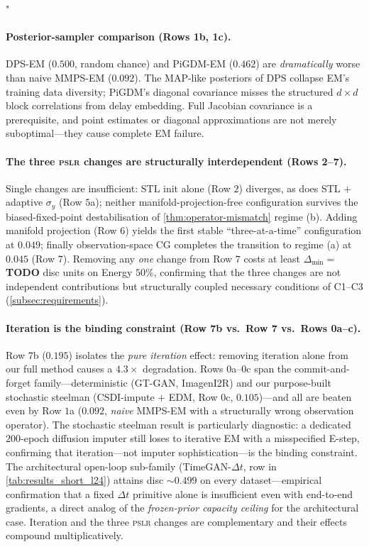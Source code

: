 "\documentclass{article}
\theoremstyle{plain}
\theoremstyle{definition}
\theoremstyle{remark}
\newcommand{\pslr}{\textsc{pslr}}
\begin{document}
\paragraph{Posterior-sampler comparison (Rows 1b, 1c).}
DPS-EM ($0.500$, random chance) and PiGDM-EM ($0.462$) are \emph{dramatically} worse than naive MMPS-EM ($0.092$). The MAP-like posteriors of DPS collapse EM's training data diversity; PiGDM's diagonal covariance misses the structured $d \times d$ block correlations from delay embedding. Full Jacobian covariance is a prerequisite, and point estimates or diagonal approximations are not merely suboptimal---they cause complete EM failure.

\paragraph{The three \pslr{} changes are structurally interdependent (Rows 2--7).}
Single changes are insufficient: STL init alone (Row $2$) diverges, as does STL $+$ adaptive $\sigma_y$ (Row $5$a); neither manifold-projection-free configuration survives the biased-fixed-point destabilisation of \cref{thm:operator-mismatch} regime (b). Adding manifold projection (Row $6$) yields the first stable ``three-at-a-time'' configuration at $0.049$; finally observation-space CG completes the transition to regime (a) at $0.045$ (Row $7$). Removing any \emph{one} change from Row $7$ costs at least $\Delta_{\min} = $ \textbf{TODO} disc units on Energy $50\%$, confirming that the three changes are not independent contributions but structurally coupled necessary conditions of C1--C3 (\cref{subsec:requirements}).

\paragraph{Iteration is the binding constraint (Row 7b vs.\ Row 7 vs.\ Rows 0a--c).}
Row $7$b ($0.195$) isolates the \emph{pure iteration} effect: removing iteration alone from our full method causes a $4.3\times$ degradation. Rows $0$a--$0$c span the commit-and-forget family---deterministic (GT-GAN, ImagenI2R) and our purpose-built stochastic steelman (CSDI-impute $+$ EDM, Row $0$c, $0.105$)---and all are beaten even by Row $1$a ($0.092$, \emph{naive} MMPS-EM with a structurally wrong observation operator). The stochastic steelman result is particularly diagnostic: a dedicated $200$-epoch diffusion imputer still loses to iterative EM with a misspecified E-step, confirming that iteration---not imputer sophistication---is the binding constraint. The architectural open-loop sub-family (TimeGAN-$\Delta t$, row in \cref{tab:results_short_l24}) attains disc ${\sim}0.499$ on every dataset---empirical confirmation that a fixed $\Delta t$ primitive alone is insufficient even with end-to-end gradients, a direct analog of the \emph{frozen-prior capacity ceiling} for the architectural case. Iteration and the three \pslr{} changes are complementary and their effects compound multiplicatively.
\end{document}
